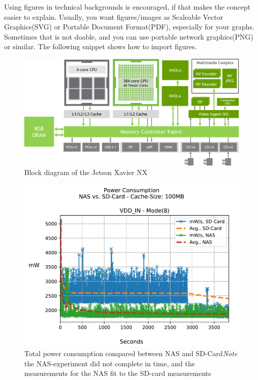 \documentclass[conference]{IEEEtran}
\begin{document}
Using figures in technical backgrounds is encouraged, if that makes the concept easier to explain. Usually, you want figures/images as Scaleable Vector Graphics(SVG) or Portable Document Format(PDF), especially for your graphs. Sometimes that is not doable, and you can use portable network graphics(PNG) or similar.
The following snippet shows how to import figures.

\begin{figure}[htbp]
	\centering
	\includegraphics[scale=0.75]{figures/jetson_nx.png}
	\caption{Block diagram of the Jetson Xavier NX}
	\label{fig:block_diagram}
\end{figure}

\begin{figure}[htbp]
	\begin{center}
		\includegraphics[width=\linewidth]{figures/NVSD_VDD_IN.pdf}
		\caption{Total power consumption compared between NAS and SD-Card\newline \emph{Note} the NAS-experiment did not complete in time, and the measurements for the NAS fit to the SD-card measurements}
		\label{fig:local_nas_sd_compare_pdf}
	\end{center}
\end{figure}
\end{document}
